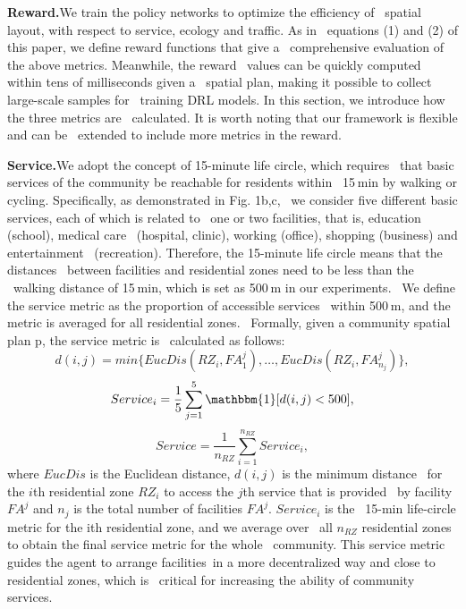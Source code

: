 \textbf{Reward.}We train the policy networks to optimize the efficiency of \
spatial layout, with respect to service, ecology and traffic. As in \
equations (1) and (2) of this paper, we define reward functions that give a \
comprehensive evaluation of the above metrics. Meanwhile, the reward \
values can be quickly computed within tens of milliseconds given a \
spatial plan, making it possible to collect large-scale samples for \
training DRL models. In this section, we introduce how the three metrics are \
calculated. It is worth noting that our framework is flexible and can be \
extended to include more metrics in the reward.

\textbf{Service.}We adopt the concept of 15-minute life circle, which requires \
that basic services of the community be reachable for residents within \
15 min by walking or cycling. Specifically, as demonstrated in Fig. 1b,c, \
we consider five different basic services, each of which is related to \
one or two facilities, that is, education (school), medical care \
(hospital, clinic), working (office), shopping (business) and entertainment \
(recreation). Therefore, the 15-minute life circle means that the distances \
between facilities and residential zones need to be less than the \
walking distance of 15 min, which is set as 500 m in our experiments. \
We define the service metric as the proportion of accessible services \
within 500 m, and the metric is averaged for all residential zones. \
Formally, given a community spatial plan p, the service metric is \
calculated as follows:
\begin{equation}
    d(i,j) = min\{EucDis(RZ_i,FA_1^j),\dots,EucDis(RZ_i,FA_{n_j}^j)\},\label{min-distance-for-the-ith-residential-zone}
\end{equation}
\begin{equation}
    Service_i = \frac{1}{5}\sum_{j=1}^{5}\mathbbm{1}[d(i,j)<500],\label{life-circle-metric-for-the-ith-residential-zone}
\end{equation}
\begin{equation}
    Service = \frac{1}{n_{RZ}}\sum_{i=1}^{n_{RZ}}Service_i,\label{life-circle-metric-for-all-residential-zones}
\end{equation}
where $EucDis$ is the Euclidean distance, $d(i,j)$ is the minimum distance \
for the $i$th residential zone $RZ_i$ to access the $j$th service that is provided \
by facility $FA^j$ and $n_j$ is the total number of facilities $FA^j$. $Service_i$ is the \
15-min life-circle metric for the ith residential zone, and we average over \
all $n_{RZ}$ residential zones to obtain the final service metric for the whole \
community. This service metric guides the agent to arrange facilities\
in a more decentralized way and close to residential zones, which is \
critical for increasing the ability of community services.

